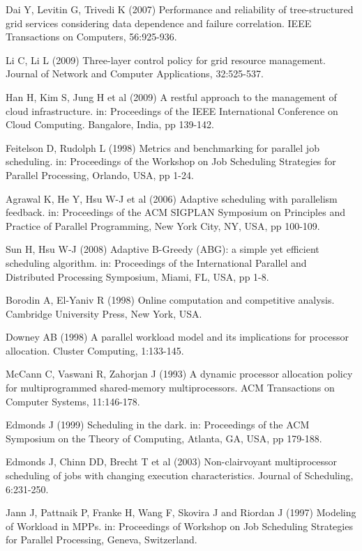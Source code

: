 \documentclass[10pt, a4paper]{article}
\begin{document}
\begin{thebibliography}{10}
Dai Y, Levitin G, Trivedi K (2007) Performance and reliability of
  tree-structured grid services considering data dependence and failure
  correlation. IEEE Transactions on Computers, 56:925-936.

Li C, Li L (2009) Three-layer control policy for grid resource management. Journal of Network and
Computer Applications, 32:525-537.

Han H, Kim S, Jung H et al (2009) A restful
  approach to the management of cloud infrastructure. in: Proceedings of the IEEE
  International Conference on Cloud Computing. Bangalore, India, pp 139-142.

Feitelson D, Rudolph L (1998) Metrics and benchmarking for parallel job
  scheduling.  in: Proceedings of the Workshop on Job Scheduling Strategies
  for Parallel Processing, Orlando, USA, pp 1-24.

Agrawal K, He Y, Hsu W-J et al (2006) Adaptive scheduling with
  parallelism feedback. in: Proceedings of the ACM SIGPLAN Symposium on
  Principles and Practice of Parallel Programming, New York City, NY, USA,
  pp 100-109.

Sun H, Hsu W-J (2008) Adaptive {B}-{G}reedy ({ABG}): a simple yet efficient
  scheduling algorithm. in: Proceedings of the International Parallel and Distributed
  Processing Symposium, Miami, FL, USA, pp 1-8.

Borodin A, El-Yaniv R (1998) Online computation and competitive
  analysis. Cambridge University Press, New York, USA.

Downey AB (1998) A parallel workload model and its implications for processor
  allocation. Cluster Computing, 1:133-145.

McCann C, Vaswani R, Zahorjan J (1993) A dynamic processor allocation policy
  for multiprogrammed shared-memory multiprocessors. ACM Transactions
  on Computer Systems, 11:146-178.

Edmonds J (1999) Scheduling in the dark. in: Proceedings of the ACM
  Symposium on the Theory of Computing, Atlanta, GA, USA, pp 179-188.

Edmonds J, Chinn DD, Brecht T et al (2003) Non-clairvoyant
  multiprocessor scheduling of jobs with changing execution characteristics.
Journal of Scheduling, 6:231-250.

Jann J, Pattnaik P, Franke H, Wang F, Skovira J and Riordan J (1997) Modeling of Workload in
{MPPs}. in: Proceedings of Workshop on Job Scheduling Strategies for Parallel Processing, Geneva,
Switzerland.


\end{thebibliography}
\end{document}
